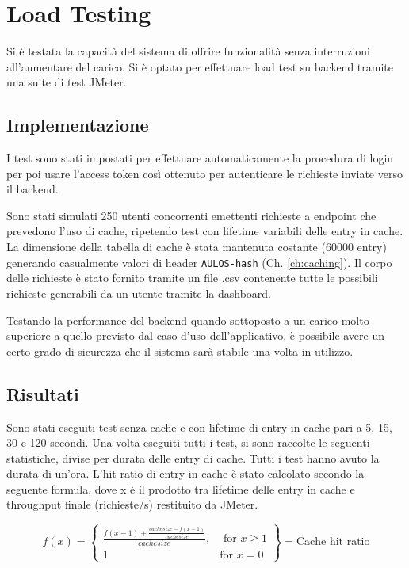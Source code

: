 \chapter{Load Testing}
\label{ch:stresstesting}
Si è testata la capacità del sistema di offrire funzionalità senza interruzioni all'aumentare del carico. 
Si è optato per effettuare load test su backend tramite una suite di test JMeter. \cite{JMETER}

\section{Implementazione}

I test sono stati impostati per effettuare automaticamente la procedura di login per poi usare l'access token così ottenuto per autenticare le richieste inviate verso il backend.

Sono stati simulati 250 utenti concorrenti emettenti richieste a endpoint che prevedono l'uso di cache, ripetendo test con lifetime variabili delle entry in cache.
La dimensione della tabella di cache è stata mantenuta costante (60000 entry) generando casualmente valori di header \verb|AULOS-hash| (Ch. \ref{ch:caching}).
Il corpo delle richieste è stato fornito tramite un file .csv contenente tutte le possibili richieste generabili da un utente tramite la dashboard.

Testando la performance del backend quando sottoposto a un carico molto superiore a quello previsto dal caso d'uso dell'applicativo, è possibile avere un certo grado di sicurezza che il sistema sarà stabile una volta in utilizzo.



\section{Risultati}
Sono stati eseguiti test senza cache e con lifetime di entry in cache pari a 5, 15, 30 e 120 secondi. 
Una volta eseguiti tutti i test, si sono raccolte le seguenti statistiche, divise per durata delle entry di cache. Tutti i test hanno avuto la durata di un'ora.
L'hit ratio di entry in cache è stato calcolato secondo la seguente formula, dove x è il prodotto tra lifetime delle entry in cache e throughput finale (richieste/s) restituito da JMeter.

\begin{Large}
\label{fig:formula}
  \[
    f(x) = \left\{\begin{array}{lr}
        \frac{f(x-1)+\frac{cachesize - f(x-1)}{cachesize}}{cachesize}, & \text{ for } x\geq 1\\
        1 & \text{for } x=0
        \end{array}\right\} = \text{Cache hit ratio}
  \]
\end{Large}

